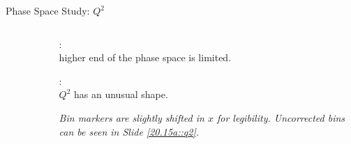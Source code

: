 \begin{frame}{Phase Space Study: $Q^2$}
    \label{12.12::q2}

    \begin{columns}[onlytextwidth,T]

    \begin{column}{.80\linewidth}
        \vspace{-15pt}
        \begin{center}
            \begin{figure}[t]
            \end{figure}
        \end{center}
    \end{column}

    \begin{column}{.18\linewidth}
        \small{:\\ higher end of the phase space is limited.}

        \vspace{12pt}

        \small{:\\ $Q^2$ has an unusual shape.}

        \vspace{12pt}

        \small{}

        \vspace{15pt}

        \begin{flushright}
            \tiny{\textit{
                Bin markers are slightly shifted in $x$ for legibility.
                Uncorrected bins can be seen in Slide \textcolor{efd_purple}{\ref{20.15a::q2}}.
            }}
        \end{flushright}
    \end{column}

    \end{columns}
\end{frame}

